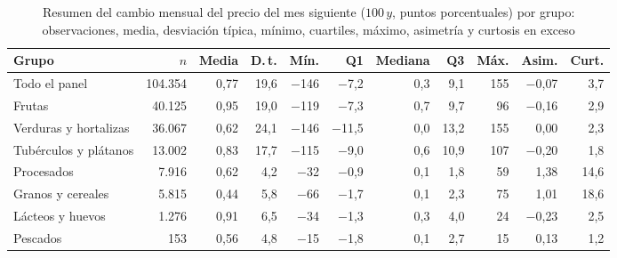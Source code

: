 \begin{table}[htbp]\centering\small
\caption{Resumen del cambio mensual del precio del mes siguiente ($100\,y$, puntos porcentuales) por grupo: observaciones, media, desviación típica, mínimo, cuartiles, máximo, asimetría y curtosis en exceso}\label{tab:resumen_y}
\begin{adjustbox}{max width=\textwidth}\begin{tabular}{lrrrrrrrrrr}\toprule
Grupo & $n$ & Media & D.\,t. & Mín. & Q1 & Mediana & Q3 & Máx. & Asim. & Curt.\\ \midrule
Todo el panel & 104.354 & 0{,}77 & 19{,}6 & \ensuremath{-}146 & \ensuremath{-}7{,}2 & 0{,}3 & 9{,}1 & 155 & \ensuremath{-}0{,}07 & 3{,}7 \\ \midrule
Frutas & 40.125 & 0{,}95 & 19{,}0 & \ensuremath{-}119 & \ensuremath{-}7{,}3 & 0{,}7 & 9{,}7 & 96 & \ensuremath{-}0{,}16 & 2{,}9 \\
Verduras y hortalizas & 36.067 & 0{,}62 & 24{,}1 & \ensuremath{-}146 & \ensuremath{-}11{,}5 & 0{,}0 & 13{,}2 & 155 & 0{,}00 & 2{,}3 \\
Tubérculos y plátanos & 13.002 & 0{,}83 & 17{,}7 & \ensuremath{-}115 & \ensuremath{-}9{,}0 & 0{,}6 & 10{,}9 & 107 & \ensuremath{-}0{,}20 & 1{,}8 \\
Procesados & 7.916 & 0{,}62 & 4{,}2 & \ensuremath{-}32 & \ensuremath{-}0{,}9 & 0{,}1 & 1{,}8 & 59 & 1{,}38 & 14{,}6 \\
Granos y cereales & 5.815 & 0{,}44 & 5{,}8 & \ensuremath{-}66 & \ensuremath{-}1{,}7 & 0{,}1 & 2{,}3 & 75 & 1{,}01 & 18{,}6 \\
Lácteos y huevos & 1.276 & 0{,}91 & 6{,}5 & \ensuremath{-}34 & \ensuremath{-}1{,}3 & 0{,}3 & 4{,}0 & 24 & \ensuremath{-}0{,}23 & 2{,}5 \\
Pescados & 153 & 0{,}56 & 4{,}8 & \ensuremath{-}15 & \ensuremath{-}1{,}8 & 0{,}1 & 2{,}7 & 15 & 0{,}13 & 1{,}2 \\
\bottomrule\end{tabular}\end{adjustbox}\end{table}
